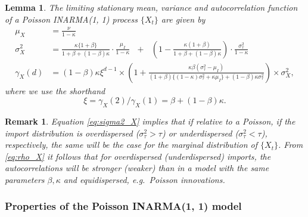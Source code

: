 \documentclass{article}
\newtheorem{lemma}{Lemma}
\newtheorem{remark}{Remark}
\begin{document}
\begin{lemma}
\label{lemma:moments_inarma_11}
The limiting stationary mean, variance and autocorrelation function of a Poisson INARMA(1, 1) process $\{X_t\}$ are given by
\begin{align}
\mu_X & = \frac{\nu}{1 - \kappa}\label{eq:mu_X}\\
\sigma^2_X & = \frac{\kappa\{1 + \beta\}}{1 + \beta + (1 - \beta)\kappa} \cdot \frac{\mu_I}{1 - \kappa}\label{eq:sigma2_X}  \ \ \ + \ \ \  \left(1 - \frac{\kappa(1 + \beta)}{1 + \beta + (1 - \beta)\kappa}\right) \cdot \frac{\sigma^2_\tau}{1 - \kappa} \\  %
\gamma_X(d) & = (1 - \beta)\kappa\xi^{d - 1} \times\left(1 + \frac{\kappa\beta(\sigma^2_\tau - \mu_I)}{(1 + \beta) \{(1 - \kappa)\sigma^2_\tau + \kappa\mu_I\} + (1 - \beta)\kappa\sigma^2_\tau}\right) \times \sigma^2_X,\label{eq:rho_X}
\end{align}
where we use the shorthand
\begin{equation}
\xi = \gamma_X(2)/\gamma_X(1) = \beta + (1 - \beta)\kappa.
\label{eq:define_xi}
\end{equation}
\end{lemma}

\begin{remark}
Equation \eqref{eq:sigma2_X} implies that if relative to a Poisson, if the import distribution is overdispersed ($\sigma^2_\tau > \tau$) or underdispersed ($\sigma^2_\tau < \tau$), respectively, the same will be the case for the marginal distribution of $\{X_t\}$. From \eqref{eq:rho_X} it follows that for overdispersed (underdispersed) imports, the autocorrelations will be stronger (weaker) than in a model with the same parameters $\beta, \kappa$ and equidispersed, e.g.\ Poisson innovations.
\end{remark}


\subsubsection{Properties of the Poisson INARMA(1, 1) model}
\end{document}
